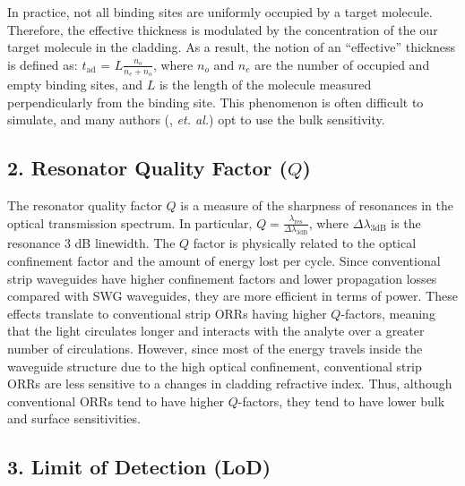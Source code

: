 \documentclass[aps,prl,twocolumn, superscriptaddress,nobalancelastpage]{revtex4}
\begin{document}
In practice, not all binding sites are uniformly occupied by a target molecule. Therefore, the effective thickness is modulated by the concentration of the our target molecule in the cladding. As a result, the notion of an ``effective'' thickness is defined as:
$t_\text{ad}$ = $L\frac{n_o}{n_e+n_o}$, where $n_o$ and $n_e$ are the number of occupied and empty binding sites, and $L$ is the length of the molecule measured perpendicularly from the binding site. This phenomenon is often difficult to simulate, and many authors (\cite{swg3, EvFieldBio,labelfree,sipresonators}, \textit{et. al.}) opt to use the bulk sensitivity.
\vspace{-1em}
\subsection{2. Resonator Quality Factor ($Q$)}
\vspace{-1em}
The resonator quality factor $Q$ is a measure of the sharpness of resonances in the optical transmission spectrum. In particular, $Q = \frac{\lambda_\text{res}}{\Delta \lambda_{3\text{dB}}}$, where $\Delta \lambda_{3\text{dB}}$ is the resonance 3 dB linewidth. The $Q$ factor is physically related to the optical confinement factor and the amount of energy lost per cycle. Since conventional strip waveguides have higher confinement factors and lower propagation losses compared with SWG waveguides, they are more efficient in terms of power. These effects translate to conventional strip ORRs having higher $Q$-factors, meaning that the light circulates longer and interacts with the analyte over a greater number of circulations. However, since most of the energy travels inside the waveguide structure due to the high optical confinement, conventional strip ORRs are less sensitive to a changes in cladding refractive index. Thus, although conventional ORRs tend to have higher $Q$-factors, they tend to have lower bulk and surface sensitivities. 

\vspace{-1em}
\subsection{3. Limit of Detection (LoD)}
\vspace{-1em}
\end{document}
